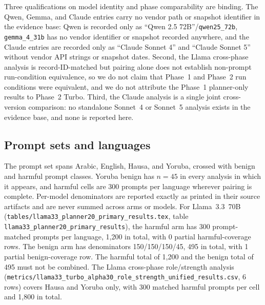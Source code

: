 Three qualifications on model identity and phase comparability are binding. The
Qwen, Gemma, and Claude entries carry no vendor path or snapshot identifier in
the evidence base: Qwen is recorded only as ``Qwen 2.5 72B''/\texttt{qwen25\_72b},
\texttt{gemma\_4\_31b} has no vendor identifier or snapshot recorded anywhere,
and the Claude entries are recorded only as ``Claude Sonnet 4'' and ``Claude
Sonnet 5'' without vendor API strings or snapshot dates. Second, the Llama
cross-phase analysis is record-ID-matched but pairing alone does not establish
non-prompt run-condition equivalence, so we do not claim that Phase~1 and
Phase~2 run conditions were equivalent, and we do not attribute the Phase~1
planner-only results to Phase~2 Turbo. Third, the Claude analysis is a single
joint cross-version comparison: no standalone Sonnet~4 or Sonnet~5 analysis
exists in the evidence base, and none is reported here.

\subsection{Prompt sets and languages}

The prompt set spans Arabic, English, Hausa, and Yoruba, crossed with benign and
harmful prompt classes. Yoruba benign has $n = 45$ in every analysis in which it
appears, and harmful cells are 300 prompts per language wherever pairing is
complete. Per-model denominators are reported exactly as printed in their source
artifacts and are never summed across arms or models. For Llama~3.3~70B
(\texttt{tables/llama33\_planner20\_primary\_results.tex}, table
\texttt{llama33\_planner20\_primary\_results}), the harmful arm has 300
prompt-matched prompts per language, 1{,}200 in total, with 0 partial
harmful-coverage rows. The benign arm has denominators 150/150/150/45,
495 in total, with 1 partial benign-coverage row. The harmful total of 1{,}200
and the benign total of 495 must not be combined. The Llama cross-phase
role/strength analysis
(\texttt{metrics/llama33\_turbo\_alpha30\_role\_strength\_unified\_results.csv},
6 rows) covers Hausa and Yoruba only, with 300 matched harmful prompts per cell
and 1{,}800 in total.

